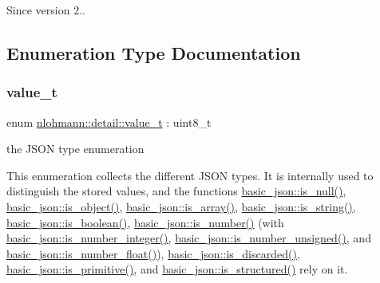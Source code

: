 \begin{DoxySince}{Since}
version 2.. 
\end{DoxySince}


\subsection{Enumeration Type Documentation}
\mbox{\label{namespacenlohmann_1_1detail_a90aa5ef615aa8305e9ea20d8a947980f}} 
\subsubsection{\texorpdfstring{value\+\_\+t}{value\_t}}
{\footnotesize\ttfamily enum \mbox{\hyperlink{namespacenlohmann_1_1detail_a90aa5ef615aa8305e9ea20d8a947980f}{nlohmann\+::detail\+::value\+\_\+t}} \+: uint8\+\_\+t\hspace{0.3cm}{\ttfamily [strong]}}



the J\+S\+ON type enumeration 

This enumeration collects the different J\+S\+ON types. It is internally used to distinguish the stored values, and the functions \mbox{\hyperlink{classnlohmann_1_1basic__json_a8faa039ca82427ed29c486ffd00600c3}{basic\+\_\+json\+::is\+\_\+null()}}, \mbox{\hyperlink{classnlohmann_1_1basic__json_af8f511af124e82e4579f444b4175787c}{basic\+\_\+json\+::is\+\_\+object()}}, \mbox{\hyperlink{classnlohmann_1_1basic__json_aef9ce5dd2381caee1f8ddcdb5bdd9c65}{basic\+\_\+json\+::is\+\_\+array()}}, \mbox{\hyperlink{classnlohmann_1_1basic__json_a69b596a4a6683b362095c9a139637396}{basic\+\_\+json\+::is\+\_\+string()}}, \mbox{\hyperlink{classnlohmann_1_1basic__json_a943e8cb182d0f2365c76d64b42eaa6fd}{basic\+\_\+json\+::is\+\_\+boolean()}}, \mbox{\hyperlink{classnlohmann_1_1basic__json_a2b9852390abb4b1ef5fac6984e2fc0f3}{basic\+\_\+json\+::is\+\_\+number()}} (with \mbox{\hyperlink{classnlohmann_1_1basic__json_abac8af76067f1e8fdca9052882c74428}{basic\+\_\+json\+::is\+\_\+number\+\_\+integer()}}, \mbox{\hyperlink{classnlohmann_1_1basic__json_abc7378cba0613a78b9aad1c8e7044bb0}{basic\+\_\+json\+::is\+\_\+number\+\_\+unsigned()}}, and \mbox{\hyperlink{classnlohmann_1_1basic__json_a33b4bf898b857c962e798fc7f6e86e70}{basic\+\_\+json\+::is\+\_\+number\+\_\+float()}}), \mbox{\hyperlink{classnlohmann_1_1basic__json_aabe623bc8304c2ba92d96d91f390fab4}{basic\+\_\+json\+::is\+\_\+discarded()}}, \mbox{\hyperlink{classnlohmann_1_1basic__json_a6362b88718eb5c6d4fed6a61eed44b95}{basic\+\_\+json\+::is\+\_\+primitive()}}, and \mbox{\hyperlink{classnlohmann_1_1basic__json_a9f68a0af820c3ced7f9d17851ce4c22d}{basic\+\_\+json\+::is\+\_\+structured()}} rely on it.

